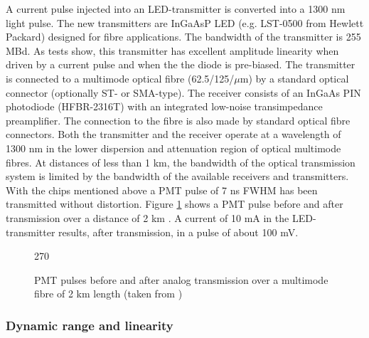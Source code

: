 A current pulse injected into an LED-transmitter is converted into a 1300 nm
light pulse. The new transmitters are InGaAsP LED (e.g. LST-0500 from
Hewlett Packard) designed for fibre applications. The bandwidth of the
transmitter is 255 MBd. As tests show, this transmitter has excellent amplitude
linearity when driven by a current pulse and when the the diode is pre-biased.
The transmitter is connected to a multimode optical
fibre (62.5/125/$\mu $m) by a standard optical connector (optionally ST- or
SMA-type). The receiver consists of an InGaAs PIN photodiode (HFBR-2316T)
with an integrated low-noise transimpedance preamplifier. The connection to
the fibre is also made by standard optical fibre connectors. Both the
transmitter and the receiver operate at a wavelength of 1300 nm in the lower
dispersion and attenuation region of optical multimode fibres. At distances
of less than 1 km, the bandwidth of the optical transmission system is
limited by the bandwidth of the available receivers and transmitters. With
the chips mentioned above a PMT pulse of 7 ns FWHM has been transmitted
without distortion. Figure \ref{fig-pulses} shows a PMT pulse before and
after transmission over a distance of 2 km \cite{karle:96}. A current of 10
mA in the LED-transmitter results, after transmission, in a pulse of about
100 mV.

\begin{figure}[htb] \centering \leavevmode
\epsfxsize=10cm
\begin{turn}{270}
\end{turn}
\caption{\label{fig-pulses}
PMT pulses before
and after analog transmission over a multimode fibre of 2 km length (taken
from \protect\cite{karle:96})}
\end{figure}


\subsubsection{Dynamic range and linearity}

